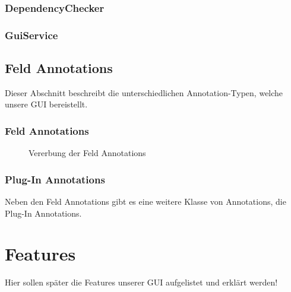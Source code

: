 \documentclass[a4paper, 11pt]{article} %
\begin{document}

\subsubsection{DependencyChecker}
\label{sssub:dependencychecker}


\subsubsection{GuiService}
\label{sssub:guiservice}



\subsection{Feld Annotations} %
\label{sub:annotations}
Dieser Abschnitt beschreibt die unterschiedlichen Annotation-Typen, welche unsere GUI bereistellt.

\subsubsection{Feld Annotations} %
\label{ssub:feld_annotations}

\begin{figure}[!htp]
\caption{Vererbung der Feld Annotations}
\label{fig:field_annotations}
\end{figure}


\subsubsection{Plug-In Annotations} %
\label{ssub:subsection_name}
Neben den Feld Annotations gibt es eine weitere Klasse von Annotations, die Plug-In Annotations. 

\section{Features} %
\label{sec:features}
Hier sollen später die Features unserer GUI aufgelistet und erklärt werden!





\end{document}
